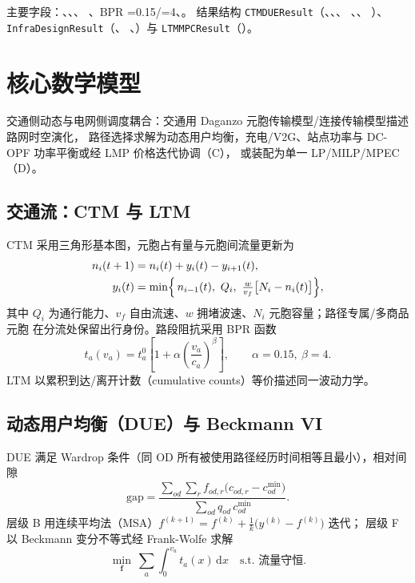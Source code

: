 \documentclass[UTF8,fontset=fandol,a4paper,11pt]{ctexart}
\begin{document}
主要字段：、、、
、BPR =0.15/=4、。
结果结构 \texttt{CTMDUEResult}（、、、
、、
）、\texttt{InfraDesignResult}（、
、）与 \texttt{LTMMPCResult}（）。

\section{核心数学模型}
交通侧动态与电网侧调度耦合：交通用 Daganzo 元胞传输模型/连接传输模型描述路网时空演化，
路径选择求解为动态用户均衡，充电/V2G、站点功率与 DC-OPF 功率平衡或经 LMP 价格迭代协调（C），
或装配为单一 LP/MILP/MPEC（D）。

\subsection{交通流：CTM 与 LTM}
CTM 采用三角形基本图，元胞占有量与元胞间流量更新为
\begin{align}
n_i(t+1) &= n_i(t) + y_i(t) - y_{i+1}(t),\\
y_i(t) &= \min\Bigl\{\, n_{i-1}(t),\ Q_i,\ \tfrac{w}{v_f}\bigl[N_i - n_i(t)\bigr] \Bigr\},
\end{align}
其中 $Q_i$ 为通行能力、$v_f$ 自由流速、$w$ 拥堵波速、$N_i$ 元胞容量；路径专属/多商品元胞
在分流处保留出行身份。路段阻抗采用 BPR 函数
\begin{equation}
t_a(v_a) = t_a^{0}\left[1 + \alpha\left(\frac{v_a}{c_a}\right)^{\beta}\right],\qquad
\alpha=0.15,\ \beta=4 .
\end{equation}
LTM 以累积到达/离开计数（cumulative counts）等价描述同一波动力学。

\subsection{动态用户均衡（DUE）与 Beckmann VI}
DUE 满足 Wardrop 条件（同 OD 所有被使用路径经历时间相等且最小），相对间隙
\begin{equation}
\mathrm{gap} = \frac{\sum_{od}\sum_{r} f_{od,r}\bigl(c_{od,r}-c_{od}^{\min}\bigr)}
                    {\sum_{od} q_{od}\, c_{od}^{\min}} .
\end{equation}
层级 B 用连续平均法（MSA）$f^{(k+1)}=f^{(k)}+\tfrac{1}{k}\bigl(y^{(k)}-f^{(k)}\bigr)$ 迭代；
层级 F 以 Beckmann 变分不等式经 Frank-Wolfe 求解
\begin{equation}
\min_{\mathbf{f}}\ \sum_{a}\int_{0}^{v_a} t_a(x)\,\mathrm{d}x
\quad \text{s.t. 流量守恒} .
\end{equation}
\end{document}
